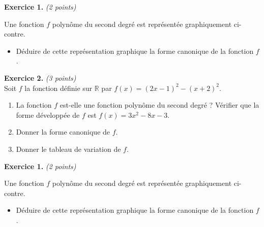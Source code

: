 \documentclass[11pt]{article}
\begin{document}

\noindent\textbf{Exercice 1.} \hspace{.5cm}\emph{(2 points)}\\
  \begin{minipage}{.47\textwidth}
  Une fonction $f$ polynôme du second degré est représentée graphiquement
  ci-contre.
 \begin{itemize}
    \item Déduire de cette représentation graphique la forme canonique de la
      fonction $f$.
  \end{itemize}
\end{minipage}
\begin{minipage}{.47\textwidth}
  \begin{center}
\end{center}
\end{minipage}

\noindent\textbf{Exercice 2.} \hspace{.5cm}\emph{(3 points)}\\
Soit $f$ la fonction définie sur $\mathbb{R}$ par $f(x)=(2x-1)^2-(x+2)^2$.
\begin{enumerate}
  \item La fonction $f$ est-elle une fonction polynôme du second degré ?
    Vérifier que la forme développée de $f$ est $f(x) = 3x^2-8x-3$.
  \item Donner la forme canonique de $f$.
  \item Donner le tableau de variation de $f$.
\end{enumerate}
\vspace{4cm}
\noindent\textbf{Exercice 1.} \hspace{.5cm}\emph{(2 points)}\\
  \begin{minipage}{.47\textwidth}
  Une fonction $f$ polynôme du second degré est représentée graphiquement
  ci-contre.
 \begin{itemize}
    \item Déduire de cette représentation graphique la forme canonique de la
      fonction $f$.
  \end{itemize}
\end{minipage}
\begin{minipage}{.47\textwidth}
  \begin{center}
\end{center}
\end{minipage}
\end{document}
